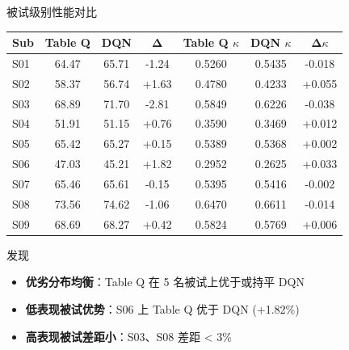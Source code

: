 \begin{frame}{被试级别性能对比}
    \centering
    \vspace{-0.5em}
    \begin{table}
        \centering
        \footnotesize
        \begin{tabular}{lcccccc}
            \toprule
            \textbf{Sub} & \textbf{Table Q} & \textbf{DQN} & \textbf{Δ} & \textbf{Table Q $\kappa$} & \textbf{DQN $\kappa$} & \textbf{Δ$\kappa$} \\
            \midrule
            S01 & 64.47 & 65.71 & -1.24 & 0.5260 & 0.5435 & -0.018 \\
            \rowcolor{lightblue}
            S02 & 58.37 & 56.74 & +1.63 & 0.4780 & 0.4233 & +0.055 \\
            S03 & 68.89 & 71.70 & -2.81 & 0.5849 & 0.6226 & -0.038 \\
            \rowcolor{lightblue}
            S04 & 51.91 & 51.15 & +0.76 & 0.3590 & 0.3469 & +0.012 \\
            S05 & 65.42 & 65.27 & +0.15 & 0.5389 & 0.5368 & +0.002 \\
            \rowcolor{lightblue}
            S06 & 47.03 & 45.21 & +1.82 & 0.2952 & 0.2625 & +0.033 \\
            S07 & 65.46 & 65.61 & -0.15 & 0.5395 & 0.5416 & -0.002 \\
            \rowcolor{lightblue}
            S08 & 73.56 & 74.62 & -1.06 & 0.6470 & 0.6611 & -0.014 \\
            S09 & 68.69 & 68.27 & +0.42 & 0.5824 & 0.5769 & +0.006 \\
            \bottomrule
        \end{tabular}
    \end{table}

    \vspace{0.3em}

    \begin{exampleblock}{\normalsize 发现}
        \begin{itemize}
            \item \textbf{优劣分布均衡}：Table Q 在 5 名被试上优于或持平 DQN
            \item \textbf{低表现被试优势}：S06 上 Table Q 优于 DQN (+1.82\%)
            \item \textbf{高表现被试差距小}：S03、S08 差距 < 3\%
        \end{itemize}
    \end{exampleblock}
\end{frame}

